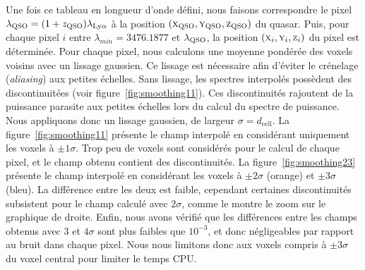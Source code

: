 Une fois ce tableau en longueur d'onde défini, nous faisons correspondre le pixel $\lambda_{\textsc{QSO}} = (1+z_{\textsc{QSO}}) \lambda_{\mathrm{Ly}\alpha}$ à la position $(\textsc{x}_{\textsc{QSO}}, \textsc{y}_{\textsc{QSO}}, \textsc{z}_{\textsc{QSO}})$ du quasar.
Puis, pour chaque pixel $i$ entre $\lambda_{min} = \num{3476.1877}$ et $\lambda_{\textsc{QSO}}$, la position $(\textsc{x}_i, \textsc{y}_i, \textsc{z}_i)$ du pixel est déterminée.
Pour chaque pixel, nous calculons une moyenne pondérée des voxels voisins avec un lissage gaussien.
  Ce lissage est nécessaire afin d'éviter le crénelage (\emph{aliasing}) aux petites échelles.
  Sans lissage, les spectres interpolés possèdent des discontinuitées (voir figure~\ref{fig:smoothing11}). Ces discontinuités rajoutent de la puissance parasite aux petites échelles lors du calcul du spectre de puissance.
  Nous appliquons donc un lissage gaussien, de largeur $\sigma = d_{\mathrm{cell}}$.
La figure~\ref{fig:smoothing11} présente le champ interpolé en considérant uniquement les voxels à $\pm 1 \sigma$. Trop peu de voxels sont considérés pour le calcul de chaque pixel, et le champ obtenu contient des discontinuités. La figure~\ref{fig:smoothing23} présente le champ interpolé en considérant les voxels à $\pm 2 \sigma$ (orange) et $\pm 3 \sigma$ (bleu). La différence entre les deux est faible, cependant certaines discontinuités subsistent pour le champ calculé avec $2 \sigma$, comme le montre le zoom sur le graphique de droite. Enfin, nous avons vérifié que les différences entre les champs obtenus avec $3$ et $4 \sigma$ sont plus faibles que $10^{-3}$, et donc négligeables par rapport au bruit dans chaque pixel. Nous nous limitons donc aux voxels compris à $\pm 3 \sigma$ du voxel central pour limiter le temps CPU.
